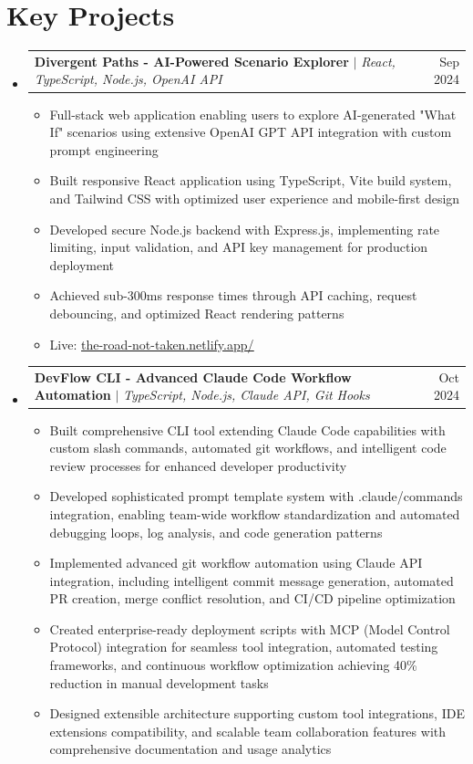 \documentclass[a4paper,11pt]{article}
\makeatletter
\newcommand{\resumeItem}[1]{
  \item\small{
    {#1 \vspace{-2pt}}
  }
}
\newcommand{\resumeProjectHeading}[2]{
    \item
    \begin{tabular*}{0.97\textwidth}{l@{\extracolsep{\fill}}r}
      \small#1 & #2 \\
    \end{tabular*}\vspace{-7pt}
}
\newcommand{\resumeSubHeadingListStart}{\begin{itemize}[leftmargin=0.15in, label={}]}
\newcommand{\resumeSubHeadingListEnd}{\end{itemize}}
\newcommand{\resumeItemListStart}{\begin{itemize}}
\newcommand{\resumeItemListEnd}{\end{itemize}\vspace{-5pt}}
\makeatother
\begin{document}
\section{Key Projects}
    \resumeSubHeadingListStart
      \resumeProjectHeading
          {\textbf{Divergent Paths - AI-Powered Scenario Explorer} $|$ \emph{React, TypeScript, Node.js, OpenAI API}}{Sep 2024}
          \resumeItemListStart
            \resumeItem{Full-stack web application enabling users to explore AI-generated "What If" scenarios using extensive OpenAI GPT API integration with custom prompt engineering}
            \resumeItem{Built responsive React application using TypeScript, Vite build system, and Tailwind CSS with optimized user experience and mobile-first design}
            \resumeItem{Developed secure Node.js backend with Express.js, implementing rate limiting, input validation, and API key management for production deployment}
            \resumeItem{Achieved sub-300ms response times through API caching, request debouncing, and optimized React rendering patterns}
            \resumeItem{Live: \href{https://the-road-not-taken.netlify.app/}{\underline{the-road-not-taken.netlify.app/}}}
          \resumeItemListEnd
      \resumeProjectHeading
          {\textbf{DevFlow CLI - Advanced Claude Code Workflow Automation} $|$ \emph{TypeScript, Node.js, Claude API, Git Hooks}}{Oct 2024}
          \resumeItemListStart
            \resumeItem{Built comprehensive CLI tool extending Claude Code capabilities with custom slash commands, automated git workflows, and intelligent code review processes for enhanced developer productivity}
            \resumeItem{Developed sophisticated prompt template system with .claude/commands integration, enabling team-wide workflow standardization and automated debugging loops, log analysis, and code generation patterns}
            \resumeItem{Implemented advanced git workflow automation using Claude API integration, including intelligent commit message generation, automated PR creation, merge conflict resolution, and CI/CD pipeline optimization}
            \resumeItem{Created enterprise-ready deployment scripts with MCP (Model Control Protocol) integration for seamless tool integration, automated testing frameworks, and continuous workflow optimization achieving 40\% reduction in manual development tasks}
            \resumeItem{Designed extensible architecture supporting custom tool integrations, IDE extensions compatibility, and scalable team collaboration features with comprehensive documentation and usage analytics}
          \resumeItemListEnd
    \resumeSubHeadingListEnd
\end{document}
